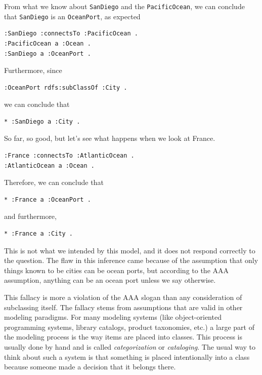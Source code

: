 From what we know about \texttt{SanDiego} and the \texttt{PacificOcean}, we can conclude
that
\texttt{SanDiego} is an \texttt{OceanPort}, as expected

\begin{lstlisting}
:SanDiego :connectsTo :PacificOcean .
:PacificOcean a :Ocean .
:SanDiego a :OceanPort .
\end{lstlisting}

Furthermore, since

\begin{lstlisting}
:OceanPort rdfs:subClassOf :City .
\end{lstlisting}

we can conclude that

\begin{lstlisting}
* :SanDiego a :City .
\end{lstlisting}

So far, so good, but let's see what happens when we look at France.

\begin{lstlisting}
:France :connectsTo :AtlanticOcean .
:AtlanticOcean a :Ocean .
\end{lstlisting}

Therefore, we can conclude that

\begin{lstlisting}
* :France a :OceanPort .
\end{lstlisting}

and furthermore,

\begin{lstlisting}
* :France a :City .
\end{lstlisting}

This is not what we intended by this model, and it does not respond
correctly to the question. The flaw in this inference came because of
the assumption that only things known to be cities can be ocean ports,
but according to the AAA assumption, anything can be an ocean port
unless we say otherwise.

This fallacy is more a violation of the AAA slogan than any
consideration of subclassing itself. The
fallacy stems from assumptions that are valid in other modeling
paradigms. For many modeling systems (like object-oriented programming
systems, library catalogs, product taxonomies, etc.) a large part of the
modeling process is the way items are placed into classes. This process
is usually done by hand and is called \emph{categorization} or \emph{cataloging}. The
usual way to think about such a system is that something is placed
intentionally into a class because someone made a decision that it
belongs there.



